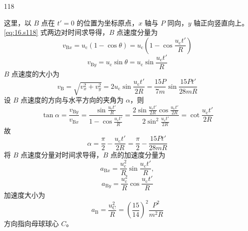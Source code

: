 \begin{solution}{118}
\begin{subsolution}
\begin{equation}
            \label{eq:17.s118}
        \end{equation}
        这里，以 $B$ 点在 $t' = 0$ 的位置为坐标原点，$x$ 轴与 $P$ 同向，$y$ 轴正向竖直向上。\eqref{eq:16.s118} 式两边对时间求导得，$B$ 点速度分量为
        \begin{equation}
            v_{\mathrm{B}x} = u_{\mathrm{c}} (1 - \cos \theta) = u_{\mathrm{c}} \left(1 - \cos \frac{u_{\mathrm{c}} t'}{R}\right)
        \end{equation}
        \begin{equation}
            v_{\mathrm{B}y} = u_{\mathrm{c}} \sin \theta = u_{\mathrm{c}} \sin \frac{u_{\mathrm{c}} t'}{R}
        \end{equation}
        $B$ 点速度的大小为
        \begin{equation}
            v_{\mathrm{B}} = \sqrt{v_{x}^{2} + v_{y}^{2}} = 2 u_{\mathrm{c}} \sin \frac{u_{\mathrm{c}} t'}{2R} = \frac{15P}{7m} \sin \frac{15P t'}{28mR}
            \label{eq:18.s118}
        \end{equation}
        设 $B$ 点速度的方向与水平方向的夹角为 $\alpha$，则
        \begin{equation}
            \tan \alpha = \frac{v_{\mathrm{B}y}}{v_{\mathrm{B}x}} = \frac{\sin \frac{u_{\mathrm{c}} t'}{R}}{1 - \cos \frac{u_{\mathrm{c}} t'}{R}} = \frac{2 \sin \frac{u_{\mathrm{c}} t'}{2R} \cos \frac{u_{\mathrm{c}} t'}{2R}}{2 \sin^{2} \frac{u_{\mathrm{c}} t'}{2R}} = \cot \frac{u_{\mathrm{c}} t'}{2R}
        \end{equation}
        故
        \begin{equation}
            \alpha = \frac{\pi}{2} - \frac{u_{\mathrm{c}} t'}{2R} = \frac{\pi}{2} - \frac{15P t'}{28mR}
            \label{eq:19.s118}
        \end{equation}
        将 $B$ 点速度分量对时间求导得，$B$ 点的加速度分量为
        \begin{equation}
            a_{\mathrm{B}x} = \frac{u_{\mathrm{c}}^{2}}{R} \sin \frac{u_{\mathrm{c}} t'}{R},
        \end{equation}
        \begin{equation}
            a_{\mathrm{B}y} = \frac{u_{\mathrm{c}}^{2}}{R} \cos \frac{u_{\mathrm{c}} t'}{R}
        \end{equation}
        加速度大小为
        \begin{equation}
            a_{\mathrm{B}} = \frac{u_{\mathrm{C}}^{2}}{R} = \left(\frac{15}{14}\right)^{2} \frac{P^{2}}{m^{2} R}
            \label{eq:20.s118}
        \end{equation}
        方向指向母球球心 $C$。
    \end{subsolution}
\end{solution}